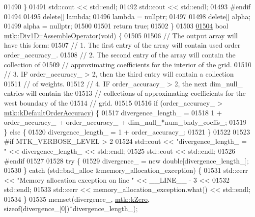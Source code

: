 \begin{DoxyCode}
{{01490   \}
01491   std::cout << std::endl;
01492   std::cout << std::endl;
01493 \textcolor{preprocessor}{  #endif}
01494 
01495   \textcolor{keyword}{delete}[] lambda;
01496   lambda = \textcolor{keyword}{nullptr};
01497 
01498   \textcolor{keyword}{delete}[] alpha;
01499   alpha = \textcolor{keyword}{nullptr};
01500 
01501   \textcolor{keywordflow}{return} \textcolor{keyword}{true};
01502 \}
01503 
\hypertarget{mtk__div__1d_8cc_source_l01504}{}\hyperlink{classmtk_1_1Div1D_a5a12482e1ceac232339dd8f647af886b}{01504} \textcolor{keywordtype}{bool} \hyperlink{classmtk_1_1Div1D_a5a12482e1ceac232339dd8f647af886b}{mtk::Div1D::AssembleOperator}(\textcolor{keywordtype}{void}) \{
01505 
01506   \textcolor{comment}{// The output array will have this form:}
01507   \textcolor{comment}{// 1. The first entry of the array will contain used order order\_accuracy\_.}
01508   \textcolor{comment}{// 2. The second entry of the array will contain the collection of}
01509   \textcolor{comment}{// approximating coefficients for the interior of the grid.}
01510   \textcolor{comment}{// 3. IF order\_accuracy\_ > 2, then the third entry will contain a collection}
01511   \textcolor{comment}{// of weights.}
01512   \textcolor{comment}{// 4. IF order\_accuracy\_ > 2, the next dim\_null\_ entries will contain the}
01513   \textcolor{comment}{// collections of approximating coefficients for the west boundary of the}
01514   \textcolor{comment}{// grid.}
01515 
01516   \textcolor{keywordflow}{if} (order\_accuracy\_ > \hyperlink{group__c01-roots_ga0d95560098eb36420511103637b6952f}{mtk::kDefaultOrderAccuracy}) \{
01517     divergence\_length\_ =
01518       1 + order\_accuracy\_ + order\_accuracy\_ + dim\_null\_*num\_bndy\_coeffs\_;
01519   \} \textcolor{keywordflow}{else} \{
01520     divergence\_length\_ = 1 + order\_accuracy\_;
01521   \}
01522 
01523 \textcolor{preprocessor}{  #if MTK\_VERBOSE\_LEVEL > 2}
01524   std::cout << \textcolor{stringliteral}{"divergence\_length\_ = "} << divergence\_length\_ << std::endl;
01525   std::cout << std::endl;
01526 \textcolor{preprocessor}{  #endif}
01527 
01528   \textcolor{keywordflow}{try} \{
01529     divergence\_ = \textcolor{keyword}{new} \textcolor{keywordtype}{double}[divergence\_length\_];
01530   \} \textcolor{keywordflow}{catch} (std::bad\_alloc &memory\_allocation\_exception) \{
01531     std::cerr << \textcolor{stringliteral}{"Memory allocation exception on line "} << \_\_LINE\_\_ - 3 <<
01532       std::endl;
01533     std::cerr << memory\_allocation\_exception.what() << std::endl;
01534   \}
01535   memset(divergence\_, \hyperlink{group__c01-roots_ga59a451a5fae30d59649bcda274fea271}{mtk::kZero}, \textcolor{keyword}{sizeof}(divergence\_[0])*divergence\_length\_);
}}
\end{DoxyCode}
